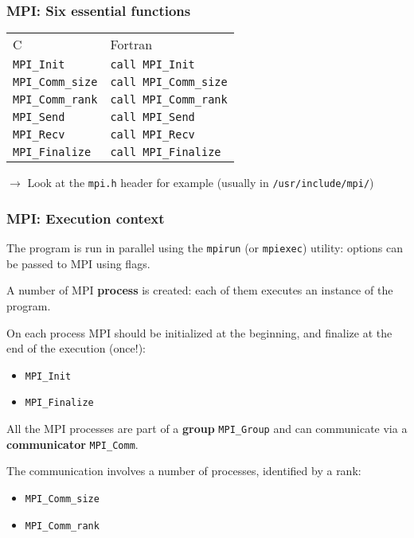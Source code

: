 \begin{frame}
  \frametitle{MPI: Six essential functions}
  \begin{center}
    \bgroup{}
    \addtolength{\tabcolsep}{0.5cm}
    \begin{tabular}{ll}
      \hline
      C & Fortran  \\
      \hhline{==}
      \texttt{MPI\_Init} & \texttt{call MPI\_Init} \\
      \texttt{MPI\_Comm\_size} & \texttt{call MPI\_Comm\_size} \\
      \texttt{MPI\_Comm\_rank} & \texttt{call MPI\_Comm\_rank} \\
      \texttt{MPI\_Send} & \texttt{call MPI\_Send} \\
      \texttt{MPI\_Recv} & \texttt{call MPI\_Recv} \\
      \texttt{MPI\_Finalize} & \texttt{call MPI\_Finalize} \\
      \hline
    \end{tabular}
    \addtolength{\tabcolsep}{-0.5cm}
    \egroup
  \end{center}

\medskip
$\rightarrow$ Look at the \texttt{mpi.h} header for example (usually in \texttt{/usr/include/mpi/})
\end{frame}

\begin{frame}
  \frametitle{MPI: Execution context}

The program is run in parallel using the \texttt{mpirun} (or \texttt{mpiexec}) utility: options can be passed to MPI using flags.

\medskip
A number of MPI \textbf{process} is created: each of them executes an instance of the program.

\medskip
On each process MPI should be initialized at the beginning, and finalize at the end of the execution (once!):
\begin{itemize}
\item \texttt{MPI\_Init}
\item  \texttt{MPI\_Finalize}
\end{itemize}

\medskip
All the MPI processes are part of a \textbf{group} \texttt{MPI\_Group} and can communicate via a \textbf{communicator} \texttt{MPI\_Comm}.

\medskip
The communication involves a number of processes, identified by a rank:
\begin{itemize}
\item \texttt{MPI\_Comm\_size}
\item \texttt{MPI\_Comm\_rank}
\end{itemize}
\end{frame}

